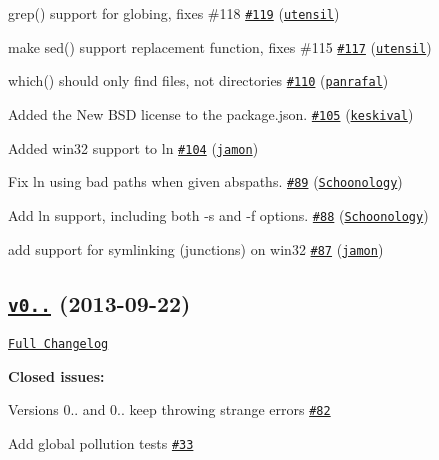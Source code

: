 \begin{DoxyItemize}
\item grep() support for globing, fixes \#118 \href{https://github.com/shelljs/shelljs/pull/119}{\tt \#119} (\href{https://github.com/utensil}{\tt utensil})
\item make sed() support replacement function, fixes \#115 \href{https://github.com/shelljs/shelljs/pull/117}{\tt \#117} (\href{https://github.com/utensil}{\tt utensil})
\item which() should only find files, not directories \href{https://github.com/shelljs/shelljs/pull/110}{\tt \#110} (\href{https://github.com/panrafal}{\tt panrafal})
\item Added the New B\+SD license to the package.\+json. \href{https://github.com/shelljs/shelljs/pull/105}{\tt \#105} (\href{https://github.com/keskival}{\tt keskival})
\item Added win32 support to ln \href{https://github.com/shelljs/shelljs/pull/104}{\tt \#104} (\href{https://github.com/jamon}{\tt jamon})
\item Fix ln using bad paths when given abspaths. \href{https://github.com/shelljs/shelljs/pull/89}{\tt \#89} (\href{https://github.com/Schoonology}{\tt Schoonology})
\item Add ln support, including both -\/s and -\/f options. \href{https://github.com/shelljs/shelljs/pull/88}{\tt \#88} (\href{https://github.com/Schoonology}{\tt Schoonology})
\item add support for symlinking (junctions) on win32 \href{https://github.com/shelljs/shelljs/pull/87}{\tt \#87} (\href{https://github.com/jamon}{\tt jamon})
\end{DoxyItemize}

\subsection*{\href{https://github.com/shelljs/shelljs/tree/v0.2.6}{\tt v0..} (2013-\/09-\/22)}

\href{https://github.com/shelljs/shelljs/compare/v0.2.5...v0.2.6}{\tt Full Changelog}

{\bfseries Closed issues\+:}


\begin{DoxyItemize}
\item Versions 0.. and 0.. keep throwing strange errors \href{https://github.com/shelljs/shelljs/issues/82}{\tt \#82}
\item Add global pollution tests \href{https://github.com/shelljs/shelljs/issues/33}{\tt \#33}
\end{DoxyItemize}

